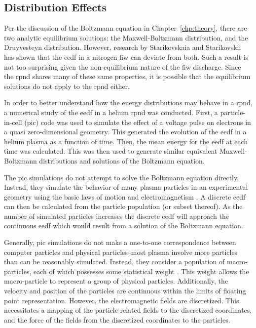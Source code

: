 \subsection{Distribution Effects}\label{sec:dists}

Per the discussion of the Boltzmann equation in Chapter~\ref{chp:theory}, there
are two analytic equilibrium solutions: the Maxwell-Boltzmann distribution, and
the Druyvesteyn distribution. However, research by Starikovskaia and
Starikovskii \cite{Starikovskaia2001} has shown that the \acs{eedf} in a
nitrogen \acs{fiw} can deviate from both. Such a result is not too surprising
given the non-equilibrium nature of the \acs{fiw} discharge. Since the
\acs{rpnd} shares many of these same properties, it is possible that the
equilibrium solutions do not apply to the \acs{rpnd} either.

In order to better understand how the energy distributions may behave in a
\acs{rpnd}, a numerical study of the \acs{eedf} in a helium \acs{rpnd} was
conducted. First, a particle-in-cell (\acs{pic}) code was used to simulate the
effect of a voltage pulse on electrons in a quasi zero-dimensional geometry.
This generated the evolution of the \acs{eedf} in a helium plasma as a function
of time. Then, the mean energy for the \acs{eedf} at each time was calculated.
This was then used to generate similar equivalent Maxwell-Boltzmann
distributions and solutions of the Boltzmann equation.

The \acs{pic} simulations do not attempt to solve the Boltzmann equation
directly. Instead, they simulate the behavior of many plasma particles in an
experimental geometry using the basic laws of motion and electromagnetism
\cite{Birdsall1991}. A discrete \acs{eedf} can then be calculated from the
particle population (or subset thereof). As the number of simulated particles
increases the discrete \acs{eedf} will approach the continuous \acs{eedf} which
would result from a solution of the Boltzmann equation.

Generally, \acs{pic} simulations do not make a one-to-one correspondence between
computer particles and physical particles--most plasma involve more particles
than can be reasonably simulated. Instead, they consider a population of
macro-particles, each of which possesses some statistical weight
\cite{Birdsall1991}. This weight allows the macro-particle to represent a group
of physical particles. Additionally, the velocity and position of the particles
are continuous within the limits of floating point representation. However, the
electromagnetic fields are discretized. This necessitates a mapping of the
particle-related fields to the discretized coordinates, and the force of the
fields from the discretized coordinates to the particles.

